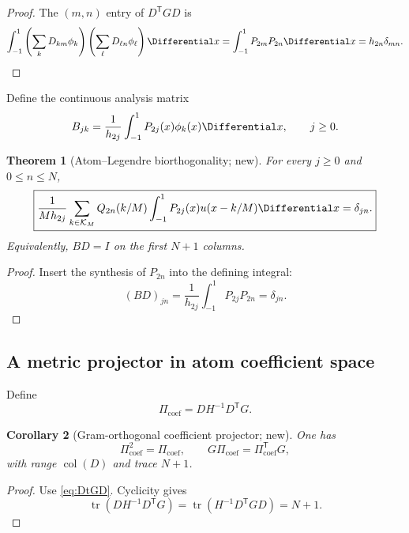 \documentclass[11pt,oneside]{article}
\numberwithin{equation}{section}
\newtheorem{theorem}{Theorem}[section]
\newtheorem{corollary}[theorem]{Corollary}
\theoremstyle{definition}
\theoremstyle{remark}
\newcommand{\tr}{\operatorname{tr}}
\begin{document}
\begin{proof}
The $(m,n)$ entry of $D^{\mathsf T}GD$ is
\[
 \int_{-1}^{1}\left(\sum_kD_{km}\phi_k\right)
 \left(\sum_\ell D_{\ell n}\phi_\ell\right)\Differential x
 =\int_{-1}^{1}P_{2m}P_{2n}\Differential x=h_{2n}\delta_{mn}.
\]
\end{proof}

Define the continuous analysis matrix
\begin{equation}
 B_{jk}=\frac1{h_{2j}}\int_{-1}^{1}P_{2j}(x)\phi_k(x)\Differential x,
 \qquad j\ge0.
 \label{eq:B-analysis}
\end{equation}

\begin{theorem}[Atom--Legendre biorthogonality; new]
\label{thm:biorthogonality}
For every $j\ge0$ and $0\le n\le N$,
\begin{equation}
 \boxed{
 \frac1{Mh_{2j}}\sum_{k\in\mathcal K_M}Q_{2n}(k/M)
 \int_{-1}^{1}P_{2j}(x)u(x-k/M)\Differential x=\delta_{jn}.}
 \label{eq:biorthogonality}
\end{equation}
Equivalently, $BD=I$ on the first $N+1$ columns.
\end{theorem}

\begin{proof}
Insert the synthesis of $P_{2n}$ into the defining integral:
\[
 (BD)_{jn}=\frac1{h_{2j}}\int_{-1}^{1}P_{2j}P_{2n}=\delta_{jn}.
\]
\end{proof}

\subsection{A metric projector in atom coefficient space}

Define
\begin{equation}
 \Pi_{\mathrm{coef}}=DH^{-1}D^{\mathsf T}G.
 \label{eq:coef-projector}
\end{equation}

\begin{corollary}[Gram-orthogonal coefficient projector; new]
\label{cor:coef-projector}
One has
\begin{equation}
 \Pi_{\mathrm{coef}}^2=\Pi_{\mathrm{coef}},\qquad
 G\Pi_{\mathrm{coef}}=\Pi_{\mathrm{coef}}^{\mathsf T}G,
 \label{eq:coef-projector-properties}
\end{equation}
with range $\operatorname{col}(D)$ and trace $N+1$.
\end{corollary}

\begin{proof}
Use \eqref{eq:DtGD}.  Cyclicity gives
\[
 \tr(DH^{-1}D^{\mathsf T}G)=\tr(H^{-1}D^{\mathsf T}GD)=N+1.
\]
\end{proof}
\end{document}
